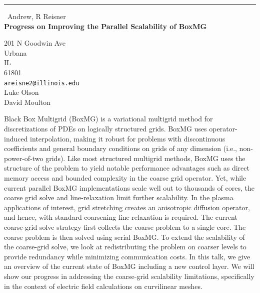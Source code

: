 \documentclass{report}
\begin{document}
\begin{center}
\rule{6in}{1pt} \
{\large Andrew, R Reisner \\
{\bf Progress on Improving the Parallel Scalability of BoxMG}}

201 N Goodwin Ave \\ Urbana \\ IL \\ 61801
\\
{\tt areisne2@illinois.edu}\\
Luke Olson\\
David Moulton\end{center}

Black Box Multigrid (BoxMG) is a variational multigrid method for discretizations
of PDEs on logically structured grids.
BoxMG uses operator-induced interpolation, making it robust for problems
with discontinuous coefficients and general boundary conditions on grids
of any dimension (i.e., non-power-of-two grids).
Like most structured multigrid methods, BoxMG uses the structure of the problem to
yield notable performance advantages such as direct memory access and bounded
complexity in the coarse grid operator. Yet, while current parallel BoxMG
implementations scale well out to thousands of cores,
the coarse grid solve and line-relaxation limit further scalability.
In the plasma applications of interest, grid stretching creates an
anisotropic diffusion operator, and hence, with standard coarsening
line-relaxation is required.
The current coarse-grid solve strategy first collects the coarse problem to a single
core. The coarse problem is then solved using serial BoxMG.
To extend the scalability of the coarse-grid solve, we look at redistributing
the problem on coarser levels to provide redundancy while minimizing communication costs.
In this talk, we give an overview of the current state of BoxMG including a new control
layer. We will show our progress in addressing the coarse-grid scalability limitations,
specifically in the context of electric field calculations on curvilinear meshes.
\end{document}
